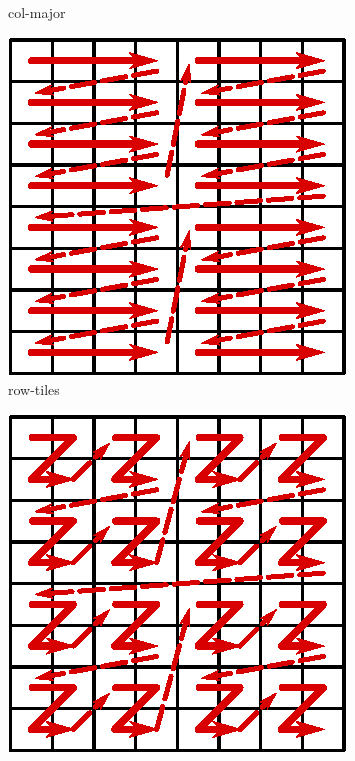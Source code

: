 \begin{figure}
\begin{subfigure}{.19\textwidth}
        \caption{col-major}
        \label{fig:layout-col}
    \end{subfigure}
    \begin{subfigure}{.19\textwidth}
        \centering
        \includegraphics[width=.9\linewidth]{noarr/figures/matrix-tiled}
        \caption{row-tiles}
        \label{fig:layout-tile}
    \end{subfigure}
    \begin{subfigure}{.19\textwidth}
        \centering
        \includegraphics[width=.9\linewidth]{noarr/figures/matrix-zcurve}

\end{subfigure}
\end{figure}
